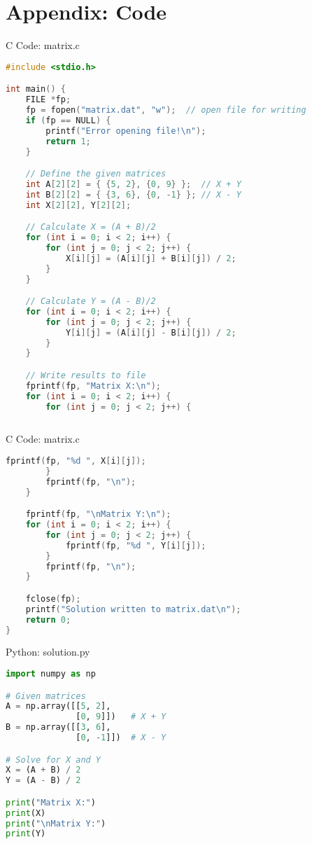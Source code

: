 \documentclass{beamer}
\numberwithin{equation}{section}
\theoremstyle{remark}
\begin{document}
\section*{Appendix: Code}

\begin{frame}[fragile]{C Code: matrix.c}
\begin{lstlisting}[language=C]
#include <stdio.h>

int main() {
    FILE *fp;
    fp = fopen("matrix.dat", "w");  // open file for writing
    if (fp == NULL) {
        printf("Error opening file!\n");
        return 1;
    }

    // Define the given matrices
    int A[2][2] = { {5, 2}, {0, 9} };  // X + Y
    int B[2][2] = { {3, 6}, {0, -1} }; // X - Y
    int X[2][2], Y[2][2];

    // Calculate X = (A + B)/2
    for (int i = 0; i < 2; i++) {
        for (int j = 0; j < 2; j++) {
            X[i][j] = (A[i][j] + B[i][j]) / 2;
        }
    }

    // Calculate Y = (A - B)/2
    for (int i = 0; i < 2; i++) {
        for (int j = 0; j < 2; j++) {
            Y[i][j] = (A[i][j] - B[i][j]) / 2;
        }
    }

    // Write results to file
    fprintf(fp, "Matrix X:\n");
    for (int i = 0; i < 2; i++) {
        for (int j = 0; j < 2; j++) {
           
\end{lstlisting}
\end{frame}

\begin{frame}[fragile]{C Code: matrix.c}
\begin{lstlisting}[language=C]
 fprintf(fp, "%d ", X[i][j]);
        }
        fprintf(fp, "\n");
    }

    fprintf(fp, "\nMatrix Y:\n");
    for (int i = 0; i < 2; i++) {
        for (int j = 0; j < 2; j++) {
            fprintf(fp, "%d ", Y[i][j]);
        }
        fprintf(fp, "\n");
    }

    fclose(fp);
    printf("Solution written to matrix.dat\n");
    return 0;
}
\end{lstlisting}
\end{frame}

\begin{frame}[fragile]{Python: solution.py}
\begin{lstlisting}[language=Python]
 import numpy as np

# Given matrices
A = np.array([[5, 2],
              [0, 9]])   # X + Y
B = np.array([[3, 6],
              [0, -1]])  # X - Y

# Solve for X and Y
X = (A + B) / 2
Y = (A - B) / 2

print("Matrix X:")
print(X)
print("\nMatrix Y:")
print(Y)



\end{lstlisting}
\end{frame} 
\end{document}
